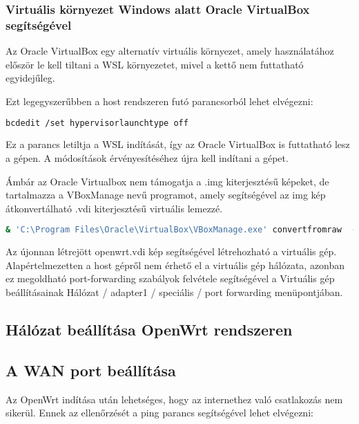 \documentclass[12pt]{article}
\begin{document}
\subsubsection{Virtuális környezet Windows alatt Oracle VirtualBox segítségével}

Az Oracle VirtualBox egy alternatív virtuális környezet, amely használatához először le kell tiltani a WSL környezetet, mivel a kettő nem futtatható egyidejűleg.

Ezt legegyszerűbben a host rendszeren futó parancsorból lehet elvégezni:

\begin{lstlisting}[language=Bash]
  bcdedit /set hypervisorlaunchtype off
\end{lstlisting}


Ez a parancs letiltja a WSL indítását, így az Oracle VirtualBox is futtatható lesz a gépen. A módosítások érvényesítéséhez újra kell indítani a gépet. \cite*{virtualbox_and_wsl}

Ámbár az Oracle Virtualbox nem támogatja a .img kiterjesztésű képeket, de tartalmazza a VBoxManage nevű programot, amely segítségével az img kép átkonvertálható .vdi kiterjesztésű virtuális lemezzé.

\begin{lstlisting}[language=Bash]
  & 'C:\Program Files\Oracle\VirtualBox\VBoxManage.exe' convertfromraw  --format VDI '.\openwrt-22.03.3-x86-64-generic-ext4-combined.img' '.\openwrt.vdi'
\end{lstlisting}

Az újonnan létrejött openwrt.vdi kép segítségével létrehozható a virtuális gép. Alapértelmezetten a host gépről nem érhető el a virtuális gép hálózata, azonban ez megoldható port-forwarding szabályok felvétele segítségével a Virtuális gép beállításainak Hálózat / adapter1 / speciális / port forwarding menüpontjában.

\newpage

\subsection{Hálózat beállítása OpenWrt rendszeren}

\subsection{A WAN port beállítása}

Az OpenWrt indítása után lehetséges, hogy az internethez való csatlakozás nem sikerül. Ennek az ellenőrzését a ping parancs segítségével lehet elvégezni:
\end{document}
